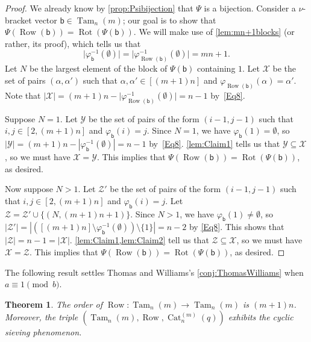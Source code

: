 \documentclass[11pt]{amsart}
\newtheorem{theorem}{Theorem}[section]
\theoremstyle{definition}
\DeclareMathOperator{\Tam}{Tam}
\DeclareMathOperator{\row}{Row}
\DeclareMathOperator{\Rot}{Rot}
\DeclareMathOperator{\Cat}{Cat}
\begin{document}
\begin{proof}
We already know by \cref{prop:Psibijection} that $\Psi$ is a bijection. Consider a $\nu$-bracket vector $\mathsf b\in\Tam_n(m)$; our goal is to show that $\Psi(\row(\mathsf b))=\Rot(\Psi(\mathsf b))$. We will make use of \cref{lem:mn+1blocks} (or rather, its proof), which tells us that 
\begin{equation}\label{Eq8}
\lvert\varphi_{\mathsf b}^{-1}(\emptyset)\rvert=\lvert\varphi_{\row(\mathsf b)}^{-1}(\emptyset)\rvert=mn+1.
\end{equation}
Let $N$ be the largest element of the block of $\Psi(\mathsf b)$ containing $1$. Let $\mathcal X$ be the set of pairs $(\alpha,\alpha')$ such that $\alpha,\alpha'\in[(m+1)n]$ and $\varphi_{\row(\mathsf b)}(\alpha)=\alpha'$. Note that $\lvert\mathcal X\rvert=(m+1)n-\lvert\varphi_{\row(\mathsf b)}^{-1}(\emptyset)\rvert=n-1$ by~\eqref{Eq8}. 

Suppose $N=1$. Let $\mathcal Y$ be the set of pairs of the form $(i-1,j-1)$ such that $i,j\in[2,(m+1)n]$ and $\varphi_{\mathsf b}(i)=j$. Since $N=1$, we have $\varphi_{\mathsf b}(1)=\emptyset$, so $|\mathcal Y|=(m+1)n-|\varphi_{\mathsf b}^{-1}(\emptyset)|=n-1$ by~\eqref{Eq8}.  \cref{lem:Claim1} tells us that $\mathcal Y\subseteq\mathcal X$, so we must have $\mathcal X=\mathcal Y$. This implies that $\Psi(\row(\mathsf b))=\Rot(\Psi(\mathsf b))$, as desired. 

Now suppose $N>1$. Let $\mathcal Z'$ be the set of pairs of the form $(i-1,j-1)$ such that $i,j\in[2,(m+1)n]$ and $\varphi_{\mathsf b}(i)=j$. Let $\mathcal Z=\mathcal Z'\cup\{(N,(m+1)n+1)\}$. Since $N>1$, we have $\varphi_{\mathsf b}(1)\neq\emptyset$, so $|\mathcal Z'|=|([(m+1)n]\setminus\varphi_{\mathsf b}^{-1}(\emptyset))\setminus\{1\}|=n-2$ by \eqref{Eq8}. This shows that $|\mathcal Z|=n-1=|\mathcal X|$. \cref{lem:Claim1,lem:Claim2} tell us that $\mathcal Z\subseteq\mathcal X$, so we must have $\mathcal X=\mathcal Z$. This implies that $\Psi(\row(\mathsf b))=\Rot(\Psi(\mathsf b))$, as desired. 
\end{proof}

The following result settles Thomas and Williams's \cref{conj:ThomasWilliams} when $a\equiv 1\pmod{b}$. 


\begin{theorem}\label{cor:mainnuTamari}
The order of $\row\colon\Tam_n(m)\to\Tam_n(m)$ is $(m+1)n$. Moreover, the triple $(\Tam_n(m),\row,\Cat_n^{(m)}(q))$ exhibits the cyclic sieving phenomenon.  
\end{theorem}
\end{document}

